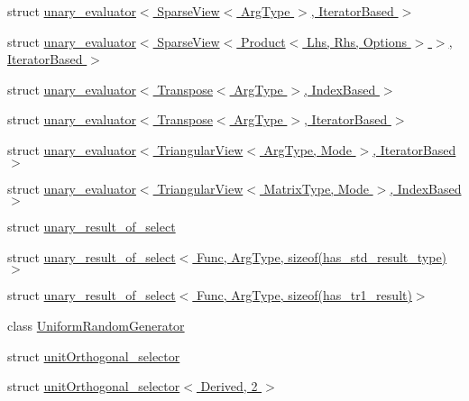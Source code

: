 \begin{DoxyCompactItemize}
struct \hyperlink{struct_eigen_1_1internal_1_1unary__evaluator_3_01_sparse_view_3_01_arg_type_01_4_00_01_iterator_based_01_4}{unary\+\_\+evaluator$<$ Sparse\+View$<$ Arg\+Type $>$, Iterator\+Based $>$}
\item 
struct \hyperlink{struct_eigen_1_1internal_1_1unary__evaluator_3_01_sparse_view_3_01_product_3_01_lhs_00_01_rhs_00009027121becdbd7ae7cc0d8a4c63ed7}{unary\+\_\+evaluator$<$ Sparse\+View$<$ Product$<$ Lhs, Rhs, Options $>$ $>$, Iterator\+Based $>$}
\item 
struct \hyperlink{struct_eigen_1_1internal_1_1unary__evaluator_3_01_transpose_3_01_arg_type_01_4_00_01_index_based_01_4}{unary\+\_\+evaluator$<$ Transpose$<$ Arg\+Type $>$, Index\+Based $>$}
\item 
struct \hyperlink{struct_eigen_1_1internal_1_1unary__evaluator_3_01_transpose_3_01_arg_type_01_4_00_01_iterator_based_01_4}{unary\+\_\+evaluator$<$ Transpose$<$ Arg\+Type $>$, Iterator\+Based $>$}
\item 
struct \hyperlink{struct_eigen_1_1internal_1_1unary__evaluator_3_01_triangular_view_3_01_arg_type_00_01_mode_01_4_00_01_iterator_based_01_4}{unary\+\_\+evaluator$<$ Triangular\+View$<$ Arg\+Type, Mode $>$, Iterator\+Based $>$}
\item 
struct \hyperlink{struct_eigen_1_1internal_1_1unary__evaluator_3_01_triangular_view_3_01_matrix_type_00_01_mode_01_4_00_01_index_based_01_4}{unary\+\_\+evaluator$<$ Triangular\+View$<$ Matrix\+Type, Mode $>$, Index\+Based $>$}
\item 
struct \hyperlink{struct_eigen_1_1internal_1_1unary__result__of__select}{unary\+\_\+result\+\_\+of\+\_\+select}
\item 
struct \hyperlink{struct_eigen_1_1internal_1_1unary__result__of__select_3_01_func_00_01_arg_type_00_01sizeof_07has__std__result__type_08_4}{unary\+\_\+result\+\_\+of\+\_\+select$<$ Func, Arg\+Type, sizeof(has\+\_\+std\+\_\+result\+\_\+type)$>$}
\item 
struct \hyperlink{struct_eigen_1_1internal_1_1unary__result__of__select_3_01_func_00_01_arg_type_00_01sizeof_07has__tr1__result_08_4}{unary\+\_\+result\+\_\+of\+\_\+select$<$ Func, Arg\+Type, sizeof(has\+\_\+tr1\+\_\+result)$>$}
\item 
class \hyperlink{class_eigen_1_1internal_1_1_uniform_random_generator}{Uniform\+Random\+Generator}
\item 
struct \hyperlink{struct_eigen_1_1internal_1_1unit_orthogonal__selector}{unit\+Orthogonal\+\_\+selector}
\item 
struct \hyperlink{struct_eigen_1_1internal_1_1unit_orthogonal__selector_3_01_derived_00_012_01_4}{unit\+Orthogonal\+\_\+selector$<$ Derived, 2 $>$}

\end{DoxyCompactItemize}

